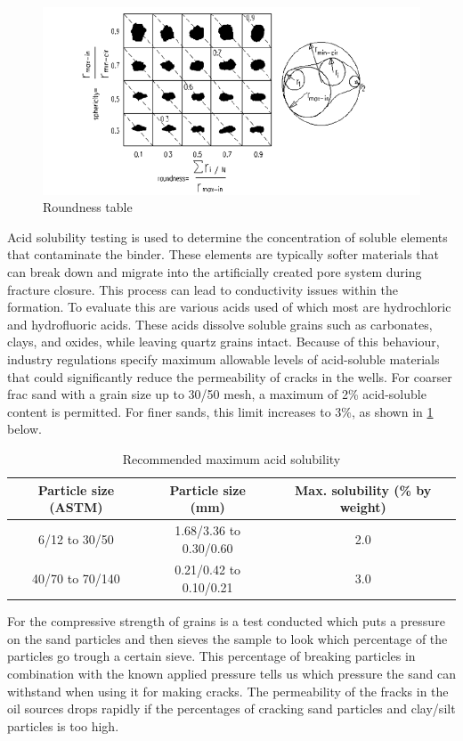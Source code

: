 \begin{figure}[H]
    \centering
    \includegraphics[width=0.75\linewidth]{figures//ch9/roundness.png}
    \caption{Roundness table \autocite{rodriguezParticleShapeQuantities2013}}
    \label{fig:RT}
\end{figure}

Acid solubility testing is used to determine the concentration of soluble elements that contaminate the binder. These elements are typically softer materials that can break down and migrate into the artificially created pore system during fracture closure. This process can lead to conductivity issues within the formation.
To evaluate this are various acids  used of which most are hydrochloric and hydrofluoric acids. These acids dissolve soluble grains such as carbonates, clays, and oxides, while leaving quartz grains intact. Because of this behaviour, industry regulations specify maximum allowable levels of acid-soluble materials that could significantly reduce the permeability of cracks in the wells.
For coarser frac sand with a grain size up to 30/50 mesh, a maximum of 2\% acid-soluble content is permitted. For finer sands, this limit increases to 3\%, as shown in \ref{tab:acid} below.

\begin{table}[h!]
\centering
\begin{tabular}{|c|c|c|}
\hline
\textbf{Particle size (ASTM)} & \textbf{Particle size (mm)} & \textbf{Max. solubility (\% by weight)} \\ \hline
6/12 to 30/50 & 1.68/3.36 to 0.30/0.60 & 2.0 \\ \hline
40/70 to 70/140 & 0.21/0.42 to 0.10/0.21 & 3.0 \\ \hline
\end{tabular}
\caption{Recommended maximum acid solubility \autocite{secretariadepoliticamineraArenasParaFracking2019}}
\label{tab:acid}
\end{table}

For the compressive strength of grains is a test conducted which puts a pressure on the sand particles and then sieves the sample to look which percentage of the particles go trough a certain sieve. This percentage of breaking particles in combination with the known applied pressure tells us which pressure the sand can withstand when using it for making cracks.
The permeability of the fracks in the oil sources drops rapidly if the percentages of cracking sand particles and clay/silt particles is too high. 

